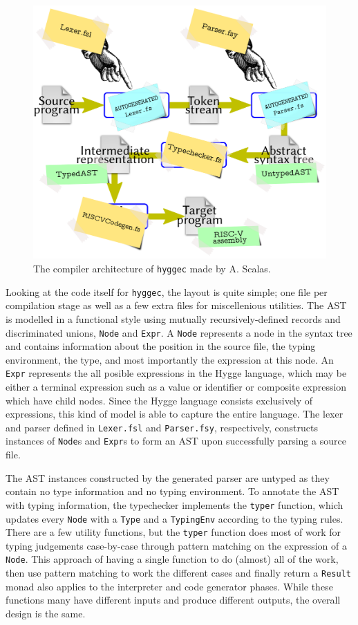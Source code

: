 \begin{figure}[H]
\centering
\includegraphics[width=\textwidth]{Pictures/hyggec_compiler_phases.png}
\caption{The compiler architecture of \texttt{hyggec} made by A. Scalas.}
\label{fig:hyggec_compiler_phases}
\end{figure}

Looking at the code itself for \texttt{hyggec}, the layout is quite simple; one file per compilation stage as well as a few extra
files for miscellenious utilities. The AST is modelled in a functional style using mutually recursively-defined records and discriminated
unions, \texttt{Node} and \texttt{Expr}. A \texttt{Node} represents a node in the syntax tree and contains information about the
position in the source file, the typing environment, the type, and most importantly the expression at this node. An \texttt{Expr}
represents the all posible expressions in the Hygge language, which may be either a terminal expression such as a value or identifier
or composite expression which have child nodes. Since the Hygge language consists exclusively of expressions, this kind of model is
able to capture the entire language. The lexer and parser defined in \texttt{Lexer.fsl} and \texttt{Parser.fsy}, respectively,
constructs instances of \texttt{Node}s and \texttt{Expr}s to form an AST upon successfully parsing a source file.

The AST instances constructed by the generated parser are untyped as they contain no type information and no typing environment.
To annotate the AST with typing information, the typechecker implements the \texttt{typer} function, which updates every \texttt{Node}
with a \texttt{Type} and a \texttt{TypingEnv} according to the typing rules. There are a few utility functions, but the \texttt{typer}
function does most of work for typing judgements case-by-case through pattern matching on the expression of a \texttt{Node}. This
approach of having a single function to do (almost) all of the work, then use pattern matching to work the different cases and
finally return a \texttt{Result} monad also applies to the interpreter and code generator phases. While these functions many have
different inputs and produce different outputs, the overall design is the same.

